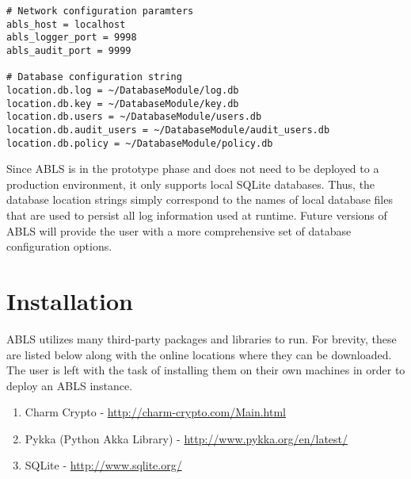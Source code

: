 \begin{lstlisting}
# Network configuration paramters
abls_host = localhost
abls_logger_port = 9998
abls_audit_port = 9999

# Database configuration string
location.db.log = ~/DatabaseModule/log.db
location.db.key = ~/DatabaseModule/key.db
location.db.users = ~/DatabaseModule/users.db
location.db.audit_users = ~/DatabaseModule/audit_users.db
location.db.policy = ~/DatabaseModule/policy.db
\end{lstlisting}

Since ABLS is in the prototype phase and does not need to be deployed to a production environment, it only 
supports local SQLite databases. Thus, the database location strings simply correspond to the names of 
local database files that are used to persist all log information used at runtime. Future versions of ABLS will 
provide the user with a more comprehensive set of database configuration options.


\section{Installation}

ABLS utilizes many third-party packages and libraries to run. For brevity, these are listed below
along with the online locations where they can be downloaded. The user is left with the task of 
installing them on their own machines in order to deploy an ABLS instance.

\begin{enumerate}
	\item Charm Crypto - \url{http://charm-crypto.com/Main.html}
	\item Pykka (Python Akka Library) - \url{http://www.pykka.org/en/latest/}
	\item SQLite - \url{http://www.sqlite.org/}
\end{enumerate}
